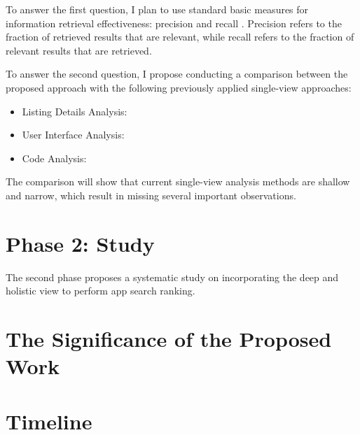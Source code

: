To answer the first question, I plan to use standard basic measures for information retrieval effectiveness: precision and recall \cite{manning_2008_intro_to_IR}.
Precision refers to the fraction of retrieved results that are relevant, while recall refers to the fraction of relevant results that are retrieved.

To answer the second question, I propose conducting a comparison between the proposed approach with the following previously applied single-view approaches:
\begin{itemize}
	\item Listing Details Analysis:
	\item User Interface Analysis:
	\item Code Analysis:
\end{itemize}
The comparison will show that current single-view analysis methods are shallow and narrow, which result in missing several important observations.

\section{Phase 2: Study}
The second phase proposes a systematic study on incorporating the deep and holistic view to perform app search ranking.
\section{The Significance of the Proposed Work}

\section{Timeline}


